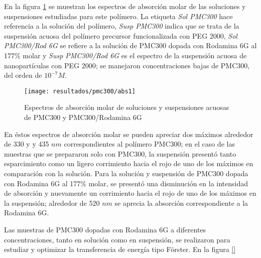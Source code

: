 En la figura \ref{pmc_abs1} se muestran los espectros de absorci\'on molar de las soluciones y suspensiones estudiadas para este pol\'imero. La etiqueta \emph{Sol PMC300} hace referencia a la soluci\'on del pol\'imero, \emph{Susp PMC300} indica que se trata de la suspensi\'on acuosa del pol\'imero precursor funcionalizada con PEG 2000, \emph{Sol PMC300/Rod 6G} se refiere a la soluci\'on de PMC300 dopada con Rodamina 6G al 177\% molar y \emph{Susp PMC300/Rod 6G} es el espectro de la suspensi\'on acuosa de nanopart\'iculas con PEG 2000; se manejaron concentraciones bajas de PMC300, del orden de $10^{-7} M$.


\begin{figure}[H]
\centering
\texttt{[image: resultados/pmc300/abs1]}
\caption{Espectros de absorci\'on molar de soluciones y suspensiones acuosas de PMC300 y PMC300/Rodamina 6G}\label{pmc_abs1}
\end{figure}

En \'estos espectros de absorci\'on molar se pueden apreciar dos m\'aximos alrededor de 330 y y 435 $nm$ correspondientes al pol\'imero PMC300; en el caso de las muestras que se prepararon solo con PMC300, la suspensi\'on present\'o tanto esparcimiento como un ligero corrimiento hacia el rojo de uno de los m\'aximos en comparaci\'on con la soluci\'on. Para la soluci\'on y suspensi\'on de PMC300 dopada con Rodamina 6G al 177\% molar, se present\'o una disminuci\'on en la intensidad de absorci\'on y nuevamente un corrimiento hacia el rojo de uno de los m\'aximos en la suspensi\'on; alrededor de 520 $nm$ se aprecia la absorci\'on correspondiente a la Rodamina 6G.

Las muestras de PMC300 dopadas con Rodamina 6G a diferentes concentraciones, tanto en soluci\'on como en suspensi\'on, se realizaron para estudiar y optimizar la transferencia de energ\'ia tipo F\"orster. En la figura \ref{}









